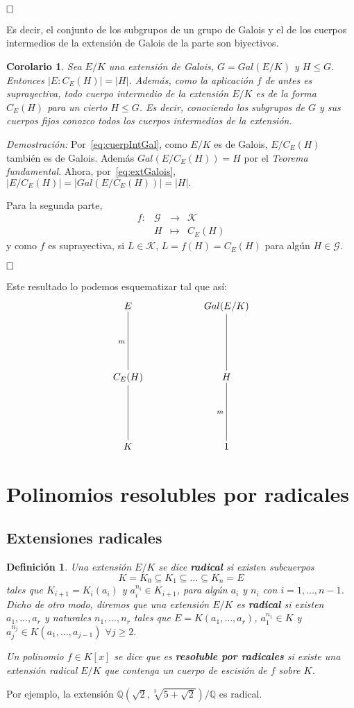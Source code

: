 \documentclass[12pt]{article}
\newtheorem{definition}[theorem]{Definición}
\newtheorem{corolario}{Corolario}[theorem]
\begin{document}
$\hfill \square$

Es decir, el conjunto de los subgrupos de un grupo de Galois y el de los cuerpos intermedios de la extensión de Galois de la parte son biyectivos.

\begin{corolario}Sea $E/K$ una extensión de Galois, $G = Gal(E/K)$ y $H \leq G$. Entonces $|E:C_{E}(H)| = |H|$. Además, como la aplicación $f$ de antes es suprayectiva, todo cuerpo intermedio de la extensión $E/K$ es de la forma $C_{E}(H)$ para un cierto $H \leq G$. Es decir, conociendo los subgrupos de $G$ y sus cuerpos fijos conozco todos los cuerpos intermedios de la extensión.
\end{corolario}
\emph{Demostración: }Por~\ref{eq:cuerpIntGal}, como $E/K$ es de Galois, $E/C_{E}(H)$ también es de Galois. Además $Gal(E/C_{E}(H))=H$ por el \textit{Teorema fundamental}. Ahora, por~\ref{eq:extGalois}, $|E/C_{E}(H)| = |Gal(E/C_{E}(H))| = |H|.$

Para la segunda parte, $$\begin{array}{rccl}
f \colon &\mathcal{G}&\longrightarrow &\mathcal{K} \\
&H& \longmapsto &C_{E}(H)
\end{array}
$$ y como $f$ es suprayectiva, si $L \in \mathcal{K}$, $L = f(H) = C_{E}(H)$ para algún $H \in \mathcal{G}$.

$\hfill \square$

Este resultado lo podemos esquematizar tal que así: 
$$\xymatrix @=2cm {E & Gal(E/K) \\ C_{E}(H)\ar@{-}[u]^m &H\ar@{-}[u] \\ K \ar@{-}[u] & 1 \ar@{-}[u]^m}$$

\section{Polinomios resolubles por radicales}

\subsection{Extensiones radicales}

\begin{definition}Una extensión $E/K$ se dice \textbf{radical} si existen subcuerpos $$K=K_{0} \subseteq K_{1} \subseteq \ldots \subseteq K_{n} = E$$ tales que $K_{i+1} = K_{i}(a_{i})$ y $a_{i}^{n_{i}} \in K_{i+1}$, para algún $a_{i}$ y $n_{i}$ con $i = 1, \ldots, n-1$. Dicho de otro modo, diremos que una extensión $E/K$ es \textbf{radical} si existen $a_{1}, \ldots, a_{r}$ y naturales $n_{1}, \ldots, n_{r}$ tales que $E=K(a_{1}, \ldots, a_{r})$, $a_{1}^{n_{1}} \in K$ y $a_{j}^{n_{j}} \in K(a_{1}, \ldots, a_{j-1})$ $\forall j \geq 2.$

Un polinomio $f \in K[x]$ se dice que es \textbf{resoluble por radicales} si existe una extensión radical $E/K$ que contenga un cuerpo de escisión de $f$ sobre $K$.
\end{definition}
Por ejemplo, la extensión $\mathbb{Q}(\sqrt{2}, \sqrt[3]{5+\sqrt{2}})/\mathbb{Q}$ es radical.
\end{document}
